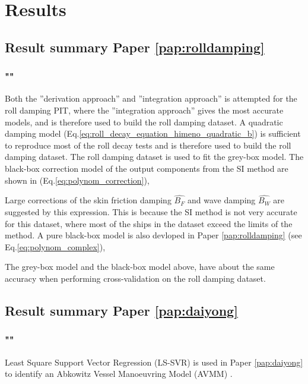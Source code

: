 \chapter{Results\label{ch:results}}

\section{Result summary Paper \ref{pap:rolldamping}}
\subsection*{""}
Both the ''derivation approach'' and ''integration approach'' is attempted for the roll damping PIT, where the ''integration approach'' gives the most accurate models, and is therefore used to build the roll damping dataset. A quadratic damping model (Eq.\ref{eq:roll_decay_equation_himeno_quadratic_b}) is sufficient to reproduce most of the roll decay tests and is therefore used to build the roll damping dataset. 
The roll damping dataset is used to fit the grey-box model. The black-box correction model of the output components from the SI method are shown in (Eq.\ref{eq:polynom_correction}),


\noindent Large corrections of the skin friction damping $\hat{B_F}$ and wave damping $\hat{B_W}$ are suggested by this expression. This is because the SI method is not very accurate for this dataset, where most of the ships in the dataset exceed the limits of the method. A pure black-box model is also devloped in Paper \ref{pap:rolldamping} (see Eq.\ref{eq:polynom_complex}),


\noindent The grey-box model and the black-box model above, have about the same accuracy when performing cross-validation on the roll damping dataset.

\section{Result summary Paper \ref{pap:daiyong}}
\subsection*{""}
Least Square Support Vector Regression (LS-SVR) \cite{brereton_support_2010} is used in Paper \ref{pap:daiyong} to identify an Abkowitz Vessel Manoeuvring Model (AVMM) \cite{abkowitz_ship_1964}. 

